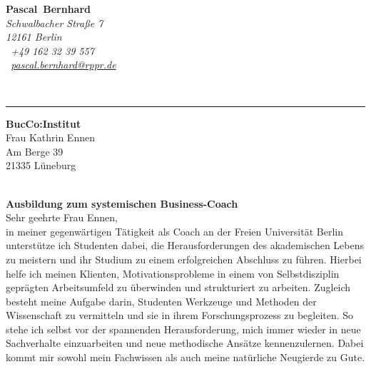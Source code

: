 \documentclass[10pt,a4paper]{article}
\def\firstname{Pascal}
\def\familyname{Bernhard}
\begin{document}
\sffamily   %
\hfill%
\begin{minipage}[t]{.6\textwidth}
	\raggedleft%
	{\bfseries {\color{firstnamecolor}\firstname}~{\color{familynamecolor}\familyname}}\\[.35ex]
	\small\itshape%
	Schwalbacher Straße 7\\
	12161 Berlin\\[.35ex]
	\Mobilefone~+49 162 32 39 557 \\
	\Letter~\href{mailto:pascal.bernhard@rppr.de}{pascal.bernhard@rppr.de}
\end{minipage}\\[0.5em]
%
{\color{firstnamecolor}\rule{\textwidth}{.25ex}}
%
\begin{minipage}[t]{.4\textwidth}
	\raggedright%
	\vspace*{1em}
	\textbf{BucCo:Institut} \\
	 Frau Kathrin Ennen\\[.35ex]
	\small%
	Am Berge 39\\
	21335 Lüneburg
	
\end{minipage}
%
\hfill
%
\begin{minipage}[t]{.4\textwidth}
	\raggedleft %
\end{minipage}\\[1.5em]
{\bfseries \color{familynamecolor}Ausbildung zum systemischen Business-Coach}\\[0.55em]

Sehr geehrte Frau Ennen,\\[0.5em]
%
in meiner gegenwärtigen Tätigkeit als Coach an der Freien Universität Berlin unterstütze ich Studenten dabei, die Herausforderungen des akademischen Lebens zu meistern und ihr Studium zu einem erfolgreichen Abschluss zu führen. Hierbei helfe ich meinen Klienten, Motivationsprobleme in einem von Selbstdisziplin geprägten Arbeitsumfeld zu überwinden und strukturiert zu arbeiten. Zugleich besteht meine Aufgabe darin, Studenten Werkzeuge und Methoden der Wissenschaft zu vermitteln und sie in ihrem Forschungsprozess zu begleiten. So stehe ich selbst vor der spannenden Herausforderung, mich immer wieder in neue Sachverhalte einzuarbeiten und neue methodische Ansätze kennenzulernen. Dabei kommt mir sowohl mein Fachwissen als auch meine natürliche Neugierde zu Gute.
\end{document}
